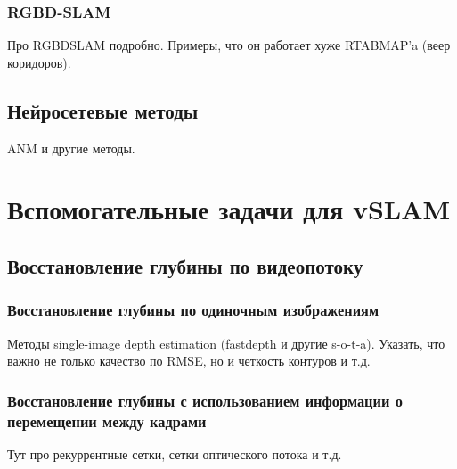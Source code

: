 \documentclass{mipt-thesis-ms}
\begin{document}
	\subsection{RGBD-SLAM}
	
	Про RGBDSLAM подробно. Примеры, что он работает хуже RTABMAP'a (веер коридоров).
	
	\section{Нейросетевые методы}
	
	ANM и другие методы.
	
	
	\chapter{Вспомогательные задачи для vSLAM}
	
	\section{Восстановление глубины по видеопотоку}
	
	\subsection{Восстановление глубины по одиночным изображениям}
	
	Методы single-image depth estimation (fastdepth и другие s-o-t-a). Указать, что важно не только качество по RMSE, но и четкость контуров и т.д.
	
	\subsection{Восстановление глубины с использованием информации о перемещении между кадрами}
	
	Тут про рекуррентные сетки, сетки оптического потока и т.д.
	
	
\end{document}
